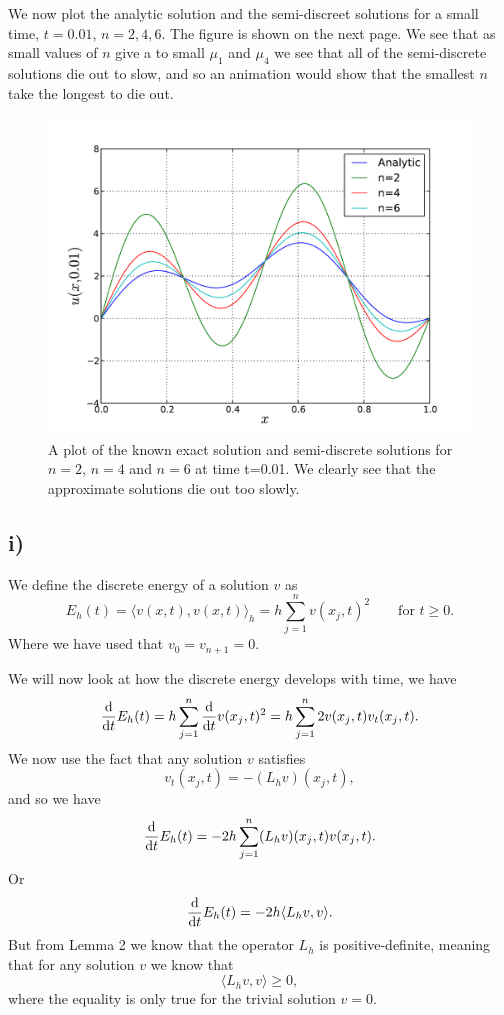 \documentclass[a4paper, 11pt, notitlepage, english]{article}
\renewcommand{\d}{{\rm d}}
\begin{document}
We now plot the analytic solution and the semi-discreet solutions for a small time, $t=0.01$, $n=2, 4, 6$. The figure is shown on the next page. We see that as small values of $n$ give a to small $\mu_1$ and $\mu_4$ we see that all of the semi-discrete solutions die out to slow, and so an animation would show that the smallest $n$ take the longest to die out.

\begin{figure}
\centering
\includegraphics[width=\textwidth]{plot_h.pdf}
\caption{A plot of the known exact solution and semi-discrete solutions for $n=2$, $n=4$ and $n=6$ at time t=0.01. We clearly see that the approximate solutions die out too slowly.}
\end{figure}

\clearpage

\subsection*{i)}

We define the discrete energy of a solution $v$ as
$$E_h(t) = \langle v(x,t), v(x,t) \rangle_h = h\sum_{j=1}^n v(x_j, t)^2 \qquad \mbox{for } t\geq 0.$$
Where we have used that $v_0 = v_{n+1} = 0$.

We will now look at how the discrete energy develops with time, we have
$$\frac{\d}{\d t} E_h(t) = h \sum_{j=1}^n \frac{\d}{\d t} v(x_j, t)^2 = h \sum_{j=1}^n 2v(x_j, t) v_t(x_j, t).$$
We now use the fact that any solution $v$ satisfies
$$v_t(x_j, t) = -(L_h v)(x_j, t),$$
and so we have
$$\frac{\d}{\d t} E_h(t) = -2h\sum_{j=1}^n (L_h v)(x_j, t) v(x_j, t).$$
Or
$$\frac{\d}{\d t} E_h(t) = -2h\langle L_h v, v\rangle.$$
But from Lemma 2 we know that the operator $L_h$ is positive-definite, meaning that for any solution $v$ we know that
$$\langle L_h v, v \rangle \geq 0,$$
where the equality is only true for the trivial solution $v = 0$.
\end{document}
